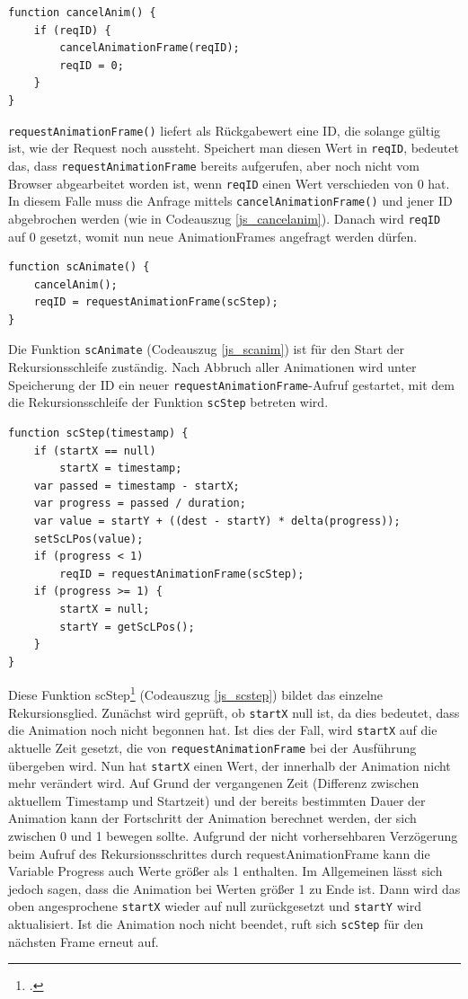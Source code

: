 \begin{lstlisting}[caption=Die Funktion cancelAnim., label=js_cancelanim]
function cancelAnim() {
	if (reqID) {
		cancelAnimationFrame(reqID);
		reqID = 0;
	}
}
\end{lstlisting}

\lstinline{requestAnimationFrame()} liefert als Rückgabewert eine ID, die solange gültig ist, wie der Request noch aussteht. Speichert man diesen Wert in \lstinline{reqID}, bedeutet das, dass \lstinline{requestAnimationFrame} bereits aufgerufen, aber noch nicht vom Browser abgearbeitet worden ist, wenn \lstinline{reqID} einen Wert verschieden von 0 hat. In diesem Falle muss die Anfrage mittels \lstinline{cancelAnimationFrame()} und jener ID abgebrochen werden (wie in Codeauszug \ref{js_cancelanim}). Danach wird \lstinline{reqID} auf 0 gesetzt, womit nun neue AnimationFrames angefragt werden dürfen.

\begin{lstlisting}[caption=Die Funktion scAnim., label=js_scanim]
function scAnimate() {
	cancelAnim();
	reqID = requestAnimationFrame(scStep);
}
\end{lstlisting}

Die Funktion \lstinline{scAnimate} (Codeauszug \ref{js_scanim}) ist für den Start der Rekursionsschleife zuständig. Nach Abbruch aller Animationen wird unter Speicherung der ID ein neuer \lstinline{requestAnimationFrame}-Aufruf gestartet, mit dem die Rekursionsschleife der Funktion \lstinline{scStep} betreten wird.

\begin{lstlisting}[caption=Die Funktion scStep., label=js_scstep]
function scStep(timestamp) {
	if (startX == null)
		startX = timestamp;
	var passed = timestamp - startX;
	var progress = passed / duration;
	var value = startY + ((dest - startY) * delta(progress));
	setScLPos(value);
	if (progress < 1)
		reqID = requestAnimationFrame(scStep);
	if (progress >= 1) {
		startX = null;
		startY = getScLPos();
	}
}
\end{lstlisting}

Diese Funktion scStep\footcite[vgl.][]{rAF} (Codeauszug \ref{js_scstep}) bildet das einzelne Rekursionsglied. Zunächst wird geprüft, ob \lstinline{startX} null ist, da dies bedeutet, dass die Animation noch nicht begonnen hat. Ist dies der Fall, wird \lstinline{startX} auf die aktuelle Zeit gesetzt, die von \lstinline{requestAnimationFrame} bei der Ausführung übergeben wird. Nun hat \lstinline{startX} einen Wert, der innerhalb der Animation nicht mehr verändert wird. Auf Grund der vergangenen Zeit (Differenz zwischen aktuellem Timestamp und Startzeit) und der bereits bestimmten Dauer der Animation kann der Fortschritt der Animation berechnet werden, der sich zwischen 0 und 1 bewegen sollte. Aufgrund der nicht vorhersehbaren Verzögerung beim Aufruf des Rekursionsschrittes durch requestAnimationFrame kann die Variable Progress auch Werte größer als 1 enthalten. Im Allgemeinen lässt sich jedoch sagen, dass die Animation bei Werten größer 1 zu Ende ist. Dann wird das oben angesprochene \lstinline{startX} wieder auf null zurückgesetzt und \lstinline{startY} wird aktualisiert. Ist die Animation noch nicht beendet, ruft sich \lstinline{scStep} für den nächsten Frame erneut auf.

